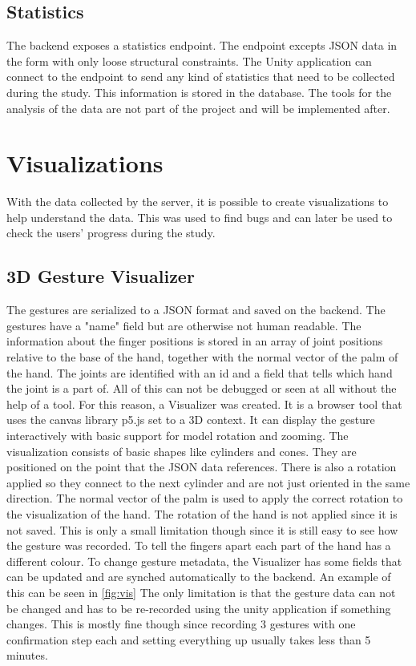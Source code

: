 \subsection{Statistics}
The backend exposes a statistics endpoint. The endpoint excepts JSON data in the form with only loose structural constraints. The Unity application can connect to the endpoint to send any kind of statistics that need to be collected during the study. This information is stored in the database. The tools for the analysis of the data are not part of the project and will be implemented after.  


\section{Visualizations}
With the data collected by the server, it is possible to create visualizations to help understand the data. This was used to find bugs and can later be used to check the users' progress during the study.

\subsection{3D Gesture Visualizer}
The gestures are serialized to a JSON format and saved on the backend. The gestures have a "name" field but are otherwise not human readable. The information about the finger positions is stored in an array of joint positions relative to the base of the hand, together with the normal vector of the palm of the hand. The joints are identified with an id and a field that tells which hand the joint is a part of. All of this can not be debugged or seen at all without the help of a tool. For this reason, a Visualizer was created. It is a browser tool that uses the canvas library p5.js set to a 3D context. It can display the gesture interactively with basic support for model rotation and zooming. The visualization consists of basic shapes like cylinders and cones. They are positioned on the point that the JSON data references. There is also a rotation applied so they connect to the next cylinder and are not just oriented in the same direction. The normal vector of the palm is used to apply the correct rotation to the visualization of the hand. The rotation of the hand is not applied since it is not saved. This is only a small limitation though since it is still easy to see how the gesture was recorded. To tell the fingers apart each part of the hand has a different colour. To change gesture metadata, the Visualizer has some fields that can be updated and are synched automatically to the backend. An example of this can be seen in \ref{fig:vis} The only limitation is that the gesture data can not be changed and has to be re-recorded using the unity application if something changes. This is mostly fine though since recording 3 gestures with one confirmation step each and setting everything up usually takes less than 5 minutes.

